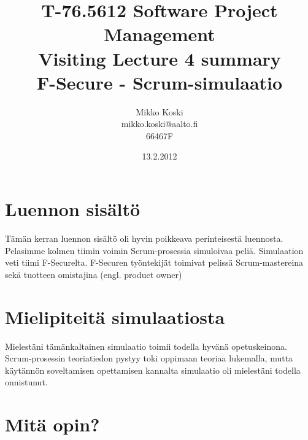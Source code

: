 \documentclass[a4paper]{article}
\begin{document}
\title{\small T-76.5612 Software Project Management \\ Visiting Lecture 4 summary \\ \huge F-Secure - Scrum-simulaatio}
\date{13.2.2012}
\author{Mikko Koski \\ mikko.koski@aalto.fi \\ 66467F}
\maketitle

\normalsize

\section{Luennon sisältö}

Tämän kerran luennon sisältö oli hyvin poikkeava perinteisestä luennosta. Pelasimme kolmen tiimin voimin Scrum-prosessia simuloivaa peliä. Simulaation veti tiimi F-Securelta. F-Securen työntekijät toimivat pelissä Scrum-mastereina sekä tuotteen omistajina (engl. product owner)

\section{Mielipiteitä simulaatiosta}

Mielestäni tämänkaltainen simulaatio toimii todella hyvänä opetuskeinona. Scrum-prosessin teoriatiedon pystyy toki oppimaan teoriaa lukemalla, mutta käytännön soveltamisen opettamisen kannalta simulaatio oli mielestäni todella onnistunut.



\section{Mitä opin?}
\end{document}
